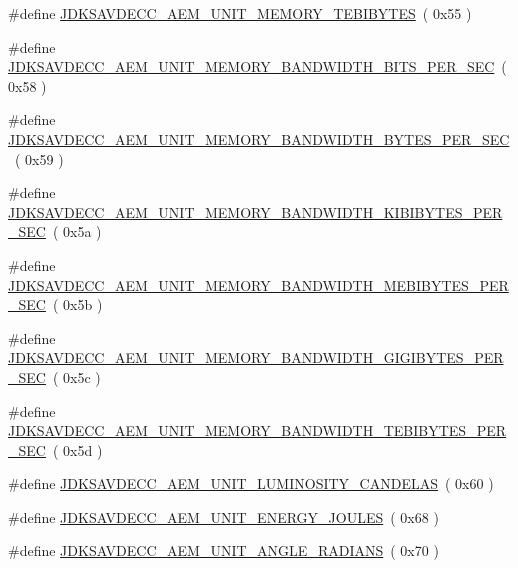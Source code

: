 \begin{DoxyCompactItemize}
\#define \hyperlink{group__units_gaa8f7ee646d7fe79d1b4fc4cb71ecf0b1}{J\+D\+K\+S\+A\+V\+D\+E\+C\+C\+\_\+\+A\+E\+M\+\_\+\+U\+N\+I\+T\+\_\+\+M\+E\+M\+O\+R\+Y\+\_\+\+T\+E\+B\+I\+B\+Y\+T\+ES}~( 0x55 )
\item 
\#define \hyperlink{group__units_ga51e4cffe680aef7e8464542336067694}{J\+D\+K\+S\+A\+V\+D\+E\+C\+C\+\_\+\+A\+E\+M\+\_\+\+U\+N\+I\+T\+\_\+\+M\+E\+M\+O\+R\+Y\+\_\+\+B\+A\+N\+D\+W\+I\+D\+T\+H\+\_\+\+B\+I\+T\+S\+\_\+\+P\+E\+R\+\_\+\+S\+EC}~( 0x58 )
\item 
\#define \hyperlink{group__units_ga5bc06596b9dc2edb0f3418ccde6f3869}{J\+D\+K\+S\+A\+V\+D\+E\+C\+C\+\_\+\+A\+E\+M\+\_\+\+U\+N\+I\+T\+\_\+\+M\+E\+M\+O\+R\+Y\+\_\+\+B\+A\+N\+D\+W\+I\+D\+T\+H\+\_\+\+B\+Y\+T\+E\+S\+\_\+\+P\+E\+R\+\_\+\+S\+EC}~( 0x59 )
\item 
\#define \hyperlink{group__units_ga312e662bea7b89f7f2168fb4181895ad}{J\+D\+K\+S\+A\+V\+D\+E\+C\+C\+\_\+\+A\+E\+M\+\_\+\+U\+N\+I\+T\+\_\+\+M\+E\+M\+O\+R\+Y\+\_\+\+B\+A\+N\+D\+W\+I\+D\+T\+H\+\_\+\+K\+I\+B\+I\+B\+Y\+T\+E\+S\+\_\+\+P\+E\+R\+\_\+\+S\+EC}~( 0x5a )
\item 
\#define \hyperlink{group__units_ga312246dbd765b11741c82978c6cf6044}{J\+D\+K\+S\+A\+V\+D\+E\+C\+C\+\_\+\+A\+E\+M\+\_\+\+U\+N\+I\+T\+\_\+\+M\+E\+M\+O\+R\+Y\+\_\+\+B\+A\+N\+D\+W\+I\+D\+T\+H\+\_\+\+M\+E\+B\+I\+B\+Y\+T\+E\+S\+\_\+\+P\+E\+R\+\_\+\+S\+EC}~( 0x5b )
\item 
\#define \hyperlink{group__units_gafb090711174065f1a9ad3aeb3b46b731}{J\+D\+K\+S\+A\+V\+D\+E\+C\+C\+\_\+\+A\+E\+M\+\_\+\+U\+N\+I\+T\+\_\+\+M\+E\+M\+O\+R\+Y\+\_\+\+B\+A\+N\+D\+W\+I\+D\+T\+H\+\_\+\+G\+I\+G\+I\+B\+Y\+T\+E\+S\+\_\+\+P\+E\+R\+\_\+\+S\+EC}~( 0x5c )
\item 
\#define \hyperlink{group__units_gaadac89f47c41337ccd1c73a9eea9e257}{J\+D\+K\+S\+A\+V\+D\+E\+C\+C\+\_\+\+A\+E\+M\+\_\+\+U\+N\+I\+T\+\_\+\+M\+E\+M\+O\+R\+Y\+\_\+\+B\+A\+N\+D\+W\+I\+D\+T\+H\+\_\+\+T\+E\+B\+I\+B\+Y\+T\+E\+S\+\_\+\+P\+E\+R\+\_\+\+S\+EC}~( 0x5d )
\item 
\#define \hyperlink{group__units_gadf671a6c401258667d8244def6d0bfe0}{J\+D\+K\+S\+A\+V\+D\+E\+C\+C\+\_\+\+A\+E\+M\+\_\+\+U\+N\+I\+T\+\_\+\+L\+U\+M\+I\+N\+O\+S\+I\+T\+Y\+\_\+\+C\+A\+N\+D\+E\+L\+AS}~( 0x60 )
\item 
\#define \hyperlink{group__units_ga9ce4ae5afd33899ea0628ddc6e33f831}{J\+D\+K\+S\+A\+V\+D\+E\+C\+C\+\_\+\+A\+E\+M\+\_\+\+U\+N\+I\+T\+\_\+\+E\+N\+E\+R\+G\+Y\+\_\+\+J\+O\+U\+L\+ES}~( 0x68 )
\item 
\#define \hyperlink{group__units_ga100e71521c15b881d7d2db8b322ace85}{J\+D\+K\+S\+A\+V\+D\+E\+C\+C\+\_\+\+A\+E\+M\+\_\+\+U\+N\+I\+T\+\_\+\+A\+N\+G\+L\+E\+\_\+\+R\+A\+D\+I\+A\+NS}~( 0x70 )

\end{DoxyCompactItemize}
